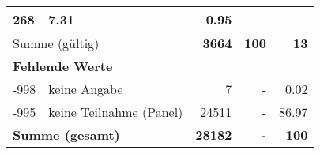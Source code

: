 \begin{longtable}{lXrrr}
       \num{268} &
       \num[round-mode=places,round-precision=2]{7.31} &
         \num[round-mode=places,round-precision=2]{0.95} \\
     \midrule
     \multicolumn{2}{l}{Summe (gültig)} &
       \textbf{\num{3664}} &
     \textbf{\num{100}} &
       \textbf{\num[round-mode=places,round-precision=2]{13}} \\
     \multicolumn{5}{l}{\textbf{Fehlende Werte}}\\
       -998 &
       keine Angabe &
         \num{7} &
        - &
         \num[round-mode=places,round-precision=2]{0.02} \\
       -995 &
       keine Teilnahme (Panel) &
         \num{24511} &
        - &
         \num[round-mode=places,round-precision=2]{86.97} \\
     \midrule
     \multicolumn{2}{l}{\textbf{Summe (gesamt)}} &
          \textbf{\num{28182}} &
        \textbf{-} &
        \textbf{\num{100}} \\
     \bottomrule
     \end{longtable}
     
